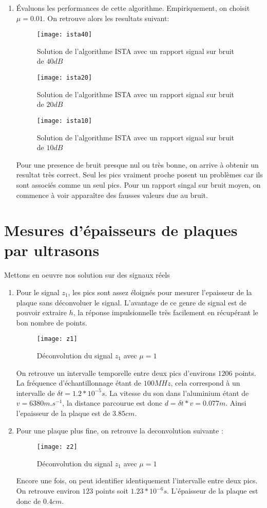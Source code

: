 \documentclass[12pt,a4paper,titlepage]{article}
\begin{document}
\begin{enumerate}
		\item{
		Évaluons les performances de cette algorithme. Empiriquement, on choisit $\mu=0.01$. On retrouve alors les resultats suivant:
		\begin{figure}[H]
    			\texttt{[image: ista40]}
		    	\centering
			\caption{Solution de l'algorithme ISTA avec un rapport signal sur bruit de $40dB$}
		\end{figure}
		\begin{figure}[H]
    			\texttt{[image: ista20]}
		    	\centering
			\caption{Solution de l'algorithme ISTA avec un rapport signal sur bruit de $20dB$}
		\end{figure}
		\begin{figure}[H]
    			\texttt{[image: ista10]}
		    	\centering
			\caption{Solution de l'algorithme ISTA avec un rapport signal sur bruit de $10dB$}
		\end{figure}
		Pour une presence de bruit presque nul ou très bonne, on arrive à obtenir un resultat très correct. Seul les pics vraiment proche posent un problèmes car ils sont associés comme un seul pics. Pour un rapport singal sur bruit moyen, on commence à voir apparaître des fausses valeurs due au bruit.
		}
	\end{enumerate}
\pagebreak
\section{Mesures d'épaisseurs de plaques par ultrasons}
	Mettons en oeuvre nos solution sur des signaux réels
	\begin{enumerate}
		\item{Pour le signal $z_1$, les pics sont assez éloignés pour mesurer l'epaisseur de la plaque sans déconvoluer le signal. L'avantage de ce genre de signal est de pouvoir extraire $h$, la réponse impulsionnelle très facilement en récupérant le bon nombre de points.
		\begin{figure}[H]
    			\texttt{[image: z1]}
		    	\centering
			\caption{Déconvolution du signal $z_1$ avec $\mu=1$}
		\end{figure}
		On retrouve un intervalle temporelle entre deux pics d'environs $1206$ points. La fréquence d'échantillonnage étant de $100MHz$, cela correspond à un intervalle de $\delta t=1.2*10^{-5}s$. La vitesse du son dans l'aluminium étant de $v=6380m.s^{-1}$, la distance parcourue est donc $d=\delta t*v=0.077m$. Ainsi l'epaisseur de la plaque est de $3.85cm$.
		}
		\item{Pour une plaque plus fine, on retrouve la deconvolution suivante : 
		\begin{figure}[H]
    			\texttt{[image: z2]}
		    	\centering
			\caption{Déconvolution du signal $z_1$ avec $\mu=1$}
		\end{figure}
		Encore une fois, on peut identifier identiquement l'intervalle entre deux pics. On retrouve environ $123$ points soit $1.23*10^{-6}s$. L'épaisseur de la plaque est donc de $0.4 cm$.		}
	\end{enumerate}
	
\end{document}
